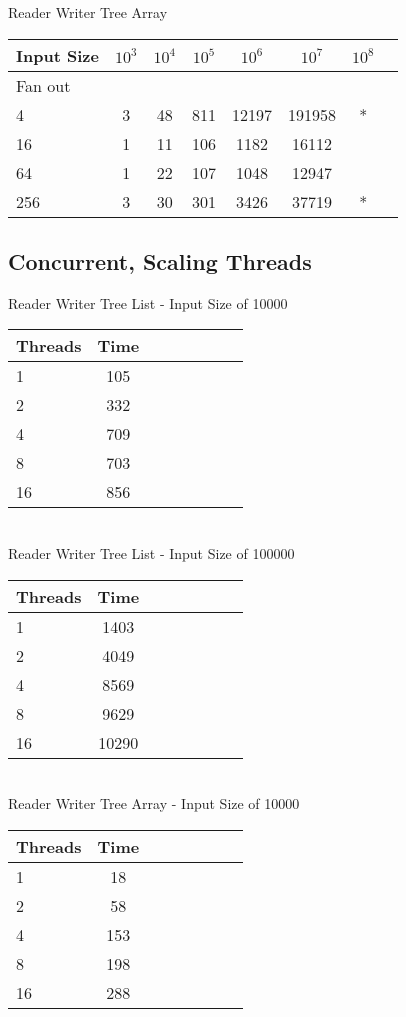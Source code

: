 \documentclass{sig-alternate}
\begin{document}
Reader Writer Tree Array \\
\begin{tabular}{| l | c | c | c | c | c | c | r}
  \hline
  Input Size & $10^3$ & $10^4$ & $10^5$ & $10^6$ & $10^7$ & $10^8$ \\ \hline
  Fan out & & & & & &  \\  \hline
  4			&	3 & 48 & 811 & 12197 & 191958 & * \\
  16		&	1 & 11 & 106 & 1182 & 16112 &  \\
  64		&	1 & 22 & 107 & 1048 & 12947 &  \\
  256		&	3 & 30 & 301 & 3426 & 37719 & * \\
  \hline
\end{tabular} 


\subsection{Concurrent, Scaling Threads}

Reader Writer Tree List - Input Size of 10000 \\
\begin{tabular}{| l | c | c | c | c | c | c | r}
  \hline
  Threads & Time \\ \hline
  1 & 105 \\
  2 & 332 \\
  4 & 709 \\
  8 & 703 \\
  16 & 856 \\
  \hline
\end{tabular} \\

Reader Writer Tree List - Input Size of 100000 \\
\begin{tabular}{| l | c | c | c | c | c | c | r}
  \hline
  Threads & Time \\ \hline
  1 & 1403 \\
  2 & 4049 \\
  4 & 8569 \\
  8 & 9629 \\
  16 & 10290 \\
  \hline
\end{tabular} \\

Reader Writer Tree Array - Input Size of 10000 \\
\begin{tabular}{| l | c | c | c | c | c | c | r}
  \hline
  Threads & Time \\ \hline
  1 & 18 \\
  2 & 58 \\
  4 & 153 \\
  8 & 198 \\
  16 & 288 \\
  \hline
\end{tabular} \\
\end{document}
